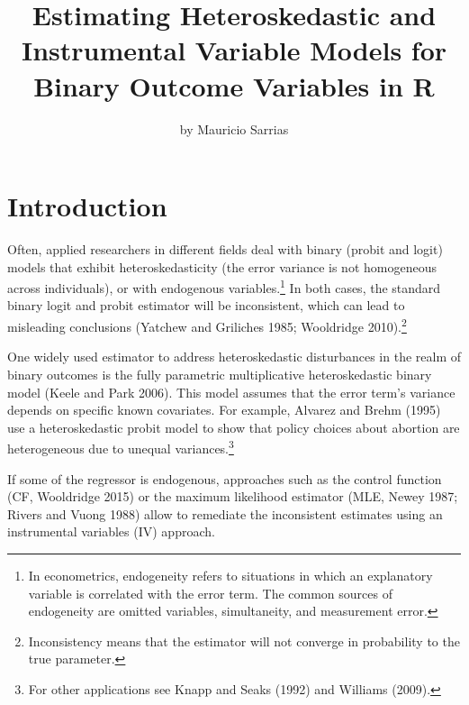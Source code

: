 \title{Estimating Heteroskedastic and Instrumental Variable Models for Binary Outcome Variables in R}


\author{by Mauricio Sarrias}

\maketitle


\hypertarget{introduction}{%
\section{Introduction}\label{introduction}}

Often, applied researchers in different fields deal with binary (probit and logit) models that exhibit heteroskedasticity (the error variance is not homogeneous across individuals), or with endogenous variables.\footnote{In econometrics, endogeneity refers to situations in which an explanatory variable is correlated with the error term. The common sources of endogeneity are omitted variables, simultaneity, and measurement error.} In both cases, the standard binary logit and probit estimator will be inconsistent, which can lead to misleading conclusions (Yatchew and Griliches 1985; Wooldridge 2010).\footnote{Inconsistency means that the estimator will not converge in probability to the true parameter.}

One widely used estimator to address heteroskedastic disturbances in the realm of binary outcomes is the fully parametric multiplicative heteroskedastic binary model (Keele and Park 2006). This model assumes that the error term's variance depends on specific known covariates. For example, Alvarez and Brehm (1995) use a heteroskedastic probit model to show that policy choices about abortion are heterogeneous due to unequal variances.\footnote{For other applications see Knapp and Seaks (1992) and Williams (2009).}

If some of the regressor is endogenous, approaches such as the control function (CF, Wooldridge 2015) or the maximum likelihood estimator (MLE, Newey 1987; Rivers and Vuong 1988) allow to remediate the inconsistent estimates using an instrumental variables (IV) approach.

